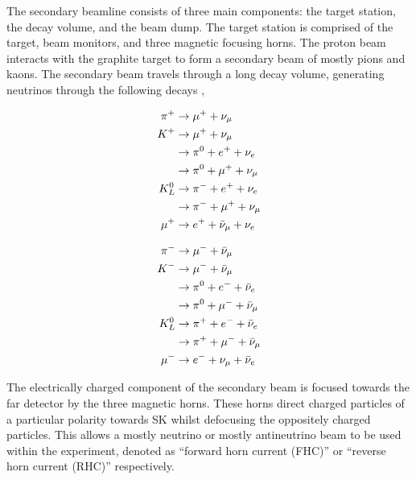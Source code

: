 The secondary beamline consists of three main components: the target station, the decay volume, and the beam dump. The target station is comprised of the target, beam monitors, and three magnetic focusing horns. The proton beam interacts with the graphite target to form a secondary beam of mostly pions and kaons. The secondary beam travels through a  long decay volume, generating neutrinos through the following decays \cite{Abe_2013},

\begin{minipage}{.45\linewidth}
  \begin{equation}
    \begin{split}
      \pi^+ &\rightarrow \mu^+ + \nu_\mu \\
      K^+ &\rightarrow \mu^+ + \nu_\mu \\
      &\rightarrow \pi^0 + e^+ + \nu_e \\
      &\rightarrow \pi^0 + \mu^+ + \nu_\mu \\
      K^0_L &\rightarrow \pi^- + e^+ + \nu_e \\
      &\rightarrow \pi^- + \mu^+ + \nu_\mu \\
      \mu^+ &\rightarrow e^+ + \bar{\nu}_\mu + \nu_e  \notag
    \end{split}
  \end{equation}
\end{minipage}%
\begin{minipage}{.45\linewidth}
  \begin{equation}
    \begin{split}
      \pi^- &\rightarrow \mu^- + \bar{\nu}_\mu\\
      K^- &\rightarrow \mu^- + \bar{\nu}_\mu \\
      &\rightarrow \pi^0 + e^- + \bar{\nu}_e\\
      &\rightarrow \pi^0 + \mu^- + \bar{\nu}_\mu \\
      K^0_L &\rightarrow \pi^+ + e^- + \bar{\nu}_e \\
      &\rightarrow \pi^+ + \mu^- + \bar{\nu}_\mu \\
      \mu^- &\rightarrow e^- + \nu_\mu + \bar{\nu}_e  \notag
    \end{split}
  \end{equation}
\end{minipage}

The electrically charged component of the secondary beam is focused towards the far detector by the three magnetic horns. These horns direct charged particles of a particular polarity towards SK whilst defocusing the oppositely charged particles. This allows a mostly neutrino or mostly antineutrino beam to be used within the experiment, denoted as ``forward horn current (FHC)'' or ``reverse horn current (RHC)'' respectively.

